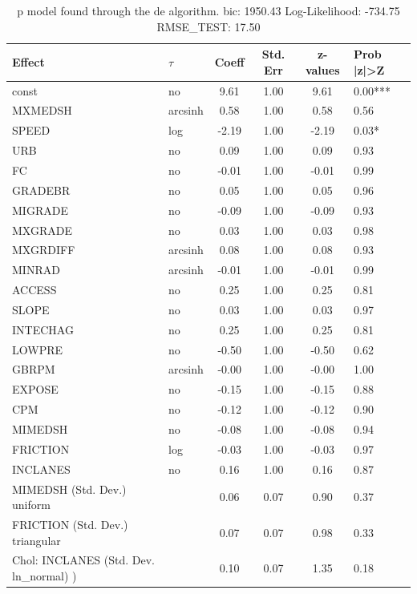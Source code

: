 \begin{table}
	\caption{p model found through the de algorithm. bic: 1950.43 Log-Likelihood: -734.75 RMSE_TEST: 17.50}
	\begin{center}
		\begin{tabular}{|l|l|c|c|c|l|}
			\hline
			Effect & $\tau$ & Coeff & Std. Err & z-values & Prob |z|>Z \\
			\hline
			const & no & 9.61 & 1.00 & 9.61 & 0.00*** \\
			\hline
			MXMEDSH & arcsinh & 0.58 & 1.00 & 0.58 & 0.56 \\
			\hline
			SPEED & log & -2.19 & 1.00 & -2.19 & 0.03* \\
			\hline
			URB & no & 0.09 & 1.00 & 0.09 & 0.93 \\
			\hline
			FC & no & -0.01 & 1.00 & -0.01 & 0.99 \\
			\hline
			GRADEBR & no & 0.05 & 1.00 & 0.05 & 0.96 \\
			\hline
			MIGRADE & no & -0.09 & 1.00 & -0.09 & 0.93 \\
			\hline
			MXGRADE & no & 0.03 & 1.00 & 0.03 & 0.98 \\
			\hline
			MXGRDIFF & arcsinh & 0.08 & 1.00 & 0.08 & 0.93 \\
			\hline
			MINRAD & arcsinh & -0.01 & 1.00 & -0.01 & 0.99 \\
			\hline
			ACCESS & no & 0.25 & 1.00 & 0.25 & 0.81 \\
			\hline
			SLOPE & no & 0.03 & 1.00 & 0.03 & 0.97 \\
			\hline
			INTECHAG & no & 0.25 & 1.00 & 0.25 & 0.81 \\
			\hline
			LOWPRE & no & -0.50 & 1.00 & -0.50 & 0.62 \\
			\hline
			GBRPM & arcsinh & -0.00 & 1.00 & -0.00 & 1.00 \\
			\hline
			EXPOSE & no & -0.15 & 1.00 & -0.15 & 0.88 \\
			\hline
			CPM & no & -0.12 & 1.00 & -0.12 & 0.90 \\
			\hline
			MIMEDSH & no & -0.08 & 1.00 & -0.08 & 0.94 \\
			\hline
			FRICTION & log & -0.03 & 1.00 & -0.03 & 0.97 \\
			\hline
			INCLANES & no & 0.16 & 1.00 & 0.16 & 0.87 \\
			\hline
			MIMEDSH (Std. Dev.) uniform &  & 0.06 & 0.07 & 0.90 & 0.37 \\
			\hline
			FRICTION (Std. Dev.) triangular &  & 0.07 & 0.07 & 0.98 & 0.33 \\
			\hline
			 Chol: INCLANES (Std. Dev. ln_normal) ) &  & 0.10 & 0.07 & 1.35 & 0.18 \\
			\hline
		\end{tabular}
	\end{center}
\end{table}
